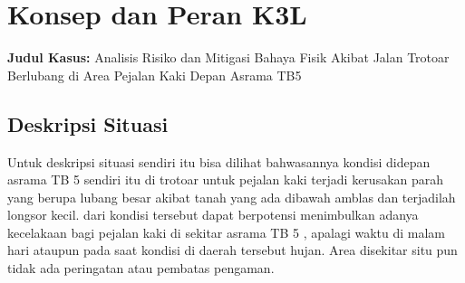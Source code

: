 \documentclass[a4paper, 12pt]{article}
\begin{document}
\section{Konsep dan Peran K3L}
\noindent\textbf{Judul Kasus:} Analisis Risiko dan Mitigasi Bahaya Fisik Akibat Jalan Trotoar Berlubang di Area Pejalan Kaki Depan Asrama TB5

\subsection{Deskripsi Situasi}
Untuk deskripsi situasi sendiri itu bisa dilihat bahwasannya kondisi didepan asrama TB 5 sendiri itu di trotoar untuk pejalan kaki terjadi kerusakan parah yang berupa lubang besar akibat tanah yang ada dibawah amblas dan terjadilah longsor kecil. dari kondisi tersebut dapat berpotensi menimbulkan adanya kecelakaan bagi pejalan kaki di sekitar asrama TB 5 , apalagi waktu di malam hari ataupun pada saat kondisi di daerah tersebut hujan. Area disekitar situ pun tidak ada peringatan atau pembatas pengaman.
\end{document}
